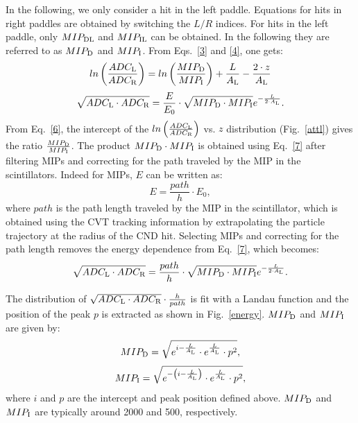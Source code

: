 In the following, we only consider a hit in the left paddle. Equations for hits in right paddles are obtained by switching the $L/R$ indices. For hits in the left paddle, only $MIP_{\rm{DL}}$ and $MIP_{\rm{IL}}$ can be obtained. In the following they are referred to as $MIP_{\rm{D}}$ and $MIP_{\rm{I}}$. From Eqs.~\ref{3} and \ref{4}, one gets:
\begin{equation}
\label{6}
ln\left(\frac{ADC_{\rm{L}}}{ADC_{\rm{R}}}\right)=ln\left(\frac{MIP_{\rm{D}}}{MIP_{\rm{I}}}\right)+{\frac{L}{A_{\rm{L}}}}-\frac{2\cdot z}{A_{\rm{L}}}
\end{equation}
\begin{equation}
\label{7}
\sqrt{ADC_{\rm{L}}\cdot ADC_{\rm{R}}}=\frac{E}{E_0}\cdot \sqrt{MIP_{\rm{D}}\cdot MIP_{\rm{I}}} e^{-\frac{L}{2\cdot A_{\rm{L}}}}.
\end{equation}
From Eq.~\ref{6}, the intercept of the $ln\left(\frac{ADC_{\rm{L}}}{ADC_{\rm{R}}}\right)$ vs. $z$ distribution (Fig.~\ref{attl}) gives the ratio $\frac{MIP_{\rm{D}}}{MIP_{\rm{I}}}$. %
The product $MIP_{\rm{D}}\cdot MIP_{\rm{I}}$ is obtained using Eq.~\ref{7} after filtering MIPs and correcting for the path traveled by the MIP in the scintillators. Indeed for MIPs, $E$ can be written as:
\begin{equation}
E=\frac{path}{h}\cdot E_0,
\end{equation}
where $path$ is the path length traveled by the MIP in the scintillator, which is obtained using the CVT tracking information by extrapolating the particle trajectory at the radius of the CND hit.
Selecting MIPs and correcting for the path length removes the energy dependence from Eq.~\ref{7}, which becomes:
\begin{equation}
\sqrt{ADC_{\rm{L}}\cdot ADC_{\rm{R}}}=\frac{path}{h}\cdot \sqrt{MIP_{\rm{D}}\cdot MIP_{\rm{I}}} e^{-\frac{L}{2\cdot A_{\rm{L}}}} .
\end{equation}

The distribution of $\sqrt{ADC_{\rm{L}}\cdot ADC_{\rm{R}}}\cdot \frac{h}{path} $ is fit with a Landau function and the position of the peak $p$ is extracted as shown in Fig.~\ref{energy}.
$MIP_{\rm{D}}$ and $MIP_{\rm{I}}$ are given by:
\begin{equation}
MIP_{\rm{D}}=\sqrt{e^{i-\frac{L}{A_{\rm{L}}}}\cdot e^{\frac{L}{A_{\rm{L}}}}\cdot p^2},
\end{equation}
\begin{equation}
MIP_{\rm{I}}=\sqrt{e^{-\left(i-\frac{L}{A_{\rm{L}}}\right)}\cdot e^{\frac{L}{A_{\rm{L}}}}\cdot p^2},
\end{equation}
where $i$ and $p$ are the intercept and peak position defined above.
$MIP_{\rm{D}}$ and $MIP_{\rm{I}}$ are typically around 2000 and 500, respectively.

